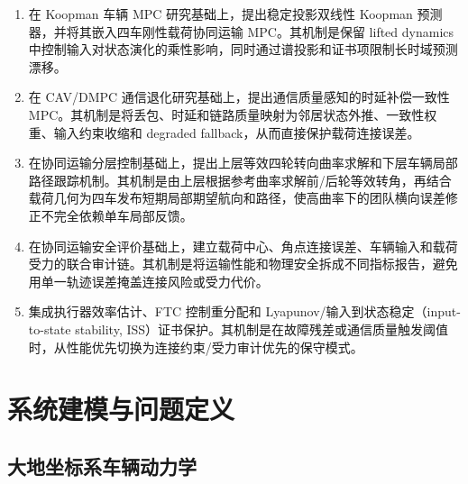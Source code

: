 \documentclass[twocolumn,3p,times,procedia]{elsarticle}
\begin{document}
\begin{enumerate}
\item 在 Koopman 车辆 MPC 研究基础上，提出稳定投影双线性 Koopman 预测器，并将其嵌入四车刚性载荷协同运输 MPC。其机制是保留 lifted dynamics 中控制输入对状态演化的乘性影响，同时通过谱投影和证书项限制长时域预测漂移。
\item 在 CAV/DMPC 通信退化研究基础上，提出通信质量感知的时延补偿一致性 MPC。其机制是将丢包、时延和链路质量映射为邻居状态外推、一致性权重、输入约束收缩和 degraded fallback，从而直接保护载荷连接误差。
\item 在协同运输分层控制基础上，提出上层等效四轮转向曲率求解和下层车辆局部路径跟踪机制。其机制是由上层根据参考曲率求解前/后轮等效转角，再结合载荷几何为四车发布短期局部期望航向和路径，使高曲率下的团队横向误差修正不完全依赖单车局部反馈。
\item 在协同运输安全评价基础上，建立载荷中心、角点连接误差、车辆输入和载荷受力的联合审计链。其机制是将运输性能和物理安全拆成不同指标报告，避免用单一轨迹误差掩盖连接风险或受力代价。
\item 集成执行器效率估计、FTC 控制重分配和 Lyapunov/输入到状态稳定（input-to-state stability, ISS）证书保护。其机制是在故障残差或通信质量触发阈值时，从性能优先切换为连接约束/受力审计优先的保守模式。
\end{enumerate}

\section{系统建模与问题定义}

\subsection{大地坐标系车辆动力学}
\end{document}
